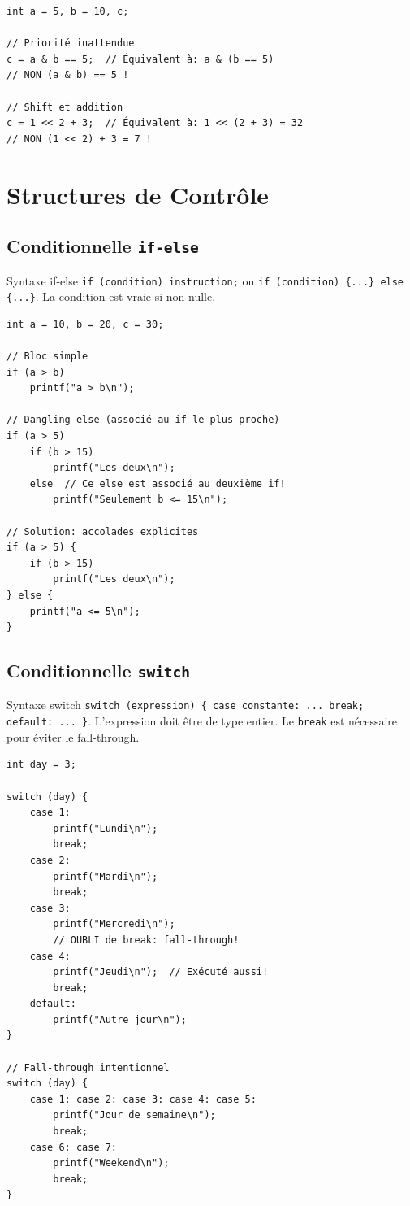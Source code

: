 \documentclass[10pt,a4paper]{article}
\begin{document}
\begin{lstlisting}[caption={Pièges de précédence}]
int a = 5, b = 10, c;

// Priorité inattendue
c = a & b == 5;  // Équivalent à: a & (b == 5)
// NON (a & b) == 5 !

// Shift et addition
c = 1 << 2 + 3;  // Équivalent à: 1 << (2 + 3) = 32
// NON (1 << 2) + 3 = 7 !
\end{lstlisting}

\section{Structures de Contrôle}

\subsection{Conditionnelle \texttt{if-else}}

\begin{definitionbox}{Syntaxe if-else}
\texttt{if (condition) instruction;} ou \texttt{if (condition) \{...\} else \{...\}}. La condition est vraie si non nulle.
\end{definitionbox}

\begin{lstlisting}[caption={If-else et dangling else}]
int a = 10, b = 20, c = 30;

// Bloc simple
if (a > b)
    printf("a > b\n");

// Dangling else (associé au if le plus proche)
if (a > 5)
    if (b > 15)
        printf("Les deux\n");
    else  // Ce else est associé au deuxième if!
        printf("Seulement b <= 15\n");

// Solution: accolades explicites
if (a > 5) {
    if (b > 15)
        printf("Les deux\n");
} else {
    printf("a <= 5\n");
}
\end{lstlisting}

\subsection{Conditionnelle \texttt{switch}}

\begin{definitionbox}{Syntaxe switch}
\texttt{switch (expression) \{ case constante: ... break; default: ... \}}. L'expression doit être de type entier. Le \texttt{break} est nécessaire pour éviter le fall-through.
\end{definitionbox}

\begin{lstlisting}[caption={Switch et fall-through}]
int day = 3;

switch (day) {
    case 1:
        printf("Lundi\n");
        break;
    case 2:
        printf("Mardi\n");
        break;
    case 3:
        printf("Mercredi\n");
        // OUBLI de break: fall-through!
    case 4:
        printf("Jeudi\n");  // Exécuté aussi!
        break;
    default:
        printf("Autre jour\n");
}

// Fall-through intentionnel
switch (day) {
    case 1: case 2: case 3: case 4: case 5:
        printf("Jour de semaine\n");
        break;
    case 6: case 7:
        printf("Weekend\n");
        break;
}
\end{lstlisting}
\end{document}
